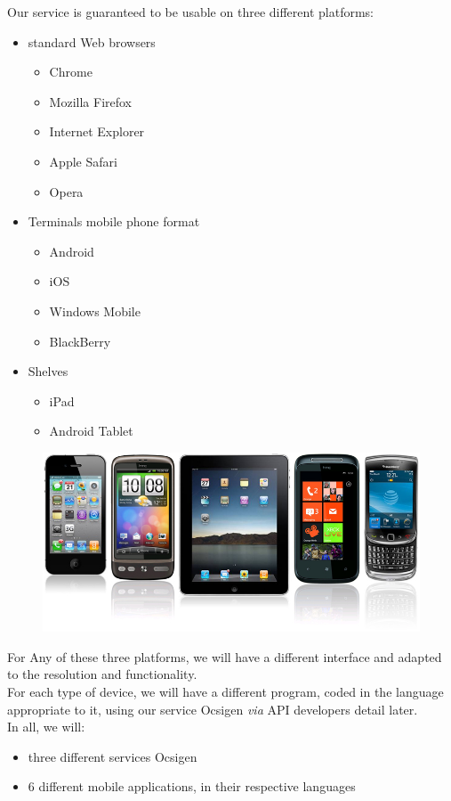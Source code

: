 \documentclass {life-en}
\begin{document}
Our service is guaranteed to be usable on three different platforms:

\begin{itemize}
  \item standard Web browsers
    \begin{itemize}
      \item Chrome
      \item Mozilla Firefox
      \item Internet Explorer
      \item Apple Safari
      \item Opera
    \end{itemize}
  \item Terminals mobile phone format
    \begin{itemize}
      \item Android
      \item iOS
      \item Windows Mobile
      \item BlackBerry
    \end{itemize}
  \item Shelves
    \begin{itemize}
      \item iPad
      \item Android Tablet
    \end{itemize}
\end{itemize}

\begin{figure} [H]
  \begin{center}
    \includegraphics [width = 13cm]{img/mobiles.jpg}
  \end{center}
\end{figure}

For Any of these three platforms, we will have a different interface
and adapted to the resolution and functionality.\\
For each type of device, we will have a different program,
coded in the language appropriate to it, using our service Ocsigen
\textit{via} API developers detail later.\\
In all, we will:
\begin{itemize}
  \item three different services Ocsigen
  \item 6 different mobile applications, in their respective languages
\end{itemize}
\end{document}
